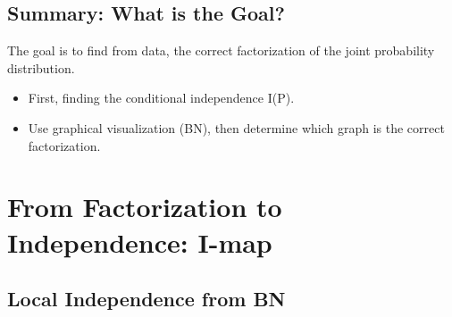 \documentclass[11pt,a4paper]{report}
\begin{document}
\section{Summary: What is the Goal?}

The goal is to find from data, the correct factorization of the joint probability distribution. 

\begin{itemize}
    \item First, finding the conditional independence I(P).
    \item Use graphical visualization (BN), then determine which graph is the correct factorization.
\end{itemize}


\chapter{From Factorization to Independence: I-map}

\section{Local Independence from BN}
\end{document}
